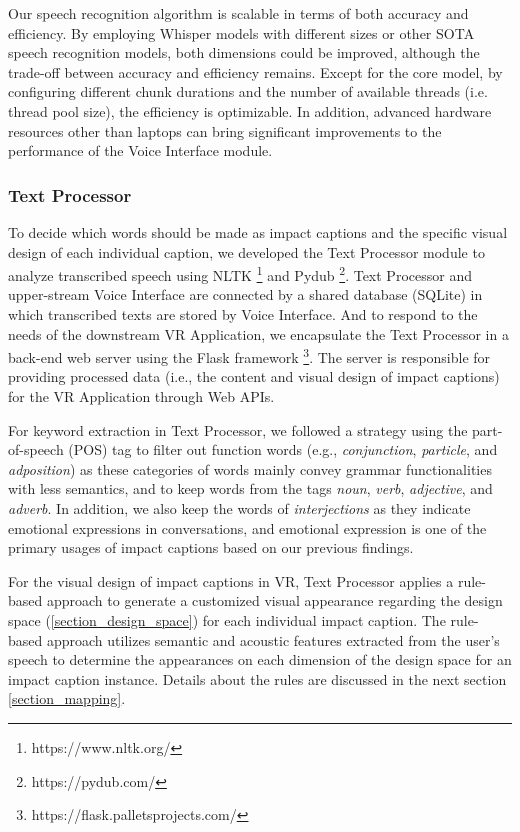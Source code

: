 Our speech recognition algorithm is scalable in terms of both accuracy and efficiency. 
By employing Whisper models with different sizes or other SOTA speech recognition models, both dimensions could be improved, although the trade-off between accuracy and efficiency remains. 
Except for the core model, by configuring different chunk durations and the number of available threads (i.e. thread pool size), the efficiency is optimizable.
In addition, advanced hardware resources other than laptops can bring significant improvements to the performance of the Voice Interface module.


\subsubsection{Text Processor}
\label{sec_text_processor}
To decide which words should be made as impact captions and the specific visual design of each individual caption, we developed the Text Processor module to analyze transcribed speech using NLTK \footnote{https://www.nltk.org/} and Pydub \footnote{https://pydub.com/}.
Text Processor and upper-stream Voice Interface are connected by a shared database (SQLite) in which transcribed texts are stored by Voice Interface. And to respond to the needs of the downstream VR Application, we encapsulate the Text Processor in a back-end web server using the Flask framework \footnote{https://flask.palletsprojects.com/}. The server is responsible for providing processed data (i.e., the content and visual design of impact captions) for the VR Application through Web APIs.

For keyword extraction in Text Processor, we followed a strategy using the part-of-speech (POS) tag to filter out function words (e.g., \textit{conjunction}, \textit{particle}, and \textit{adposition}) as these categories of words mainly convey grammar functionalities with less semantics, and to keep words from the tags \textit{noun}, \textit{verb}, \textit{adjective}, and \textit{adverb}. In addition, we also keep the words of \textit{interjections} as they indicate emotional expressions in conversations, and emotional expression is one of the primary usages of impact captions based on our previous findings.

For the visual design of impact captions in VR, Text Processor applies a rule-based approach to generate a customized visual appearance regarding the design space (\autoref{section_design_space}) for each individual impact caption. The rule-based approach utilizes semantic and acoustic features extracted from the user's speech to determine the appearances on each dimension of the design space for an impact caption instance. Details about the rules are discussed in the next section \autoref{section_mapping}.

